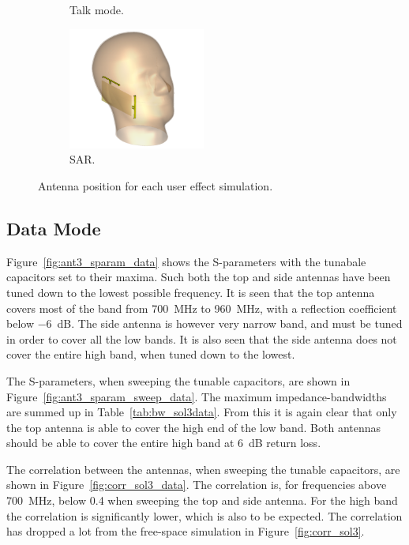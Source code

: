 \begin{figure}[htbp]
\begin{subfigure}[b]{0.24\linewidth}
        \caption{Talk mode.}
    \end{subfigure}
    \begin{subfigure}[b]{0.24\linewidth}
        \centering
        \includegraphics[width=\linewidth,height=4cm,keepaspectratio]{img/tech_sol/nonresonant/simulation/sar/3d}
        \caption{SAR.}
    \end{subfigure}
    \caption{Antenna position for each user effect simulation.}
    \label{fig:ant3_positions}
\end{figure}

\FloatBarrier
\subsection{Data Mode}
Figure~\ref{fig:ant3_sparam_data} shows the S-parameters with the tunabale capacitors set to their maxima. Such both the top and side antennas have been tuned down to the lowest possible frequency. It is seen that the top antenna covers most of the band from \SI{700}{MHz} to \SI{960}{MHz}, with a reflection coefficient below \SI{-6}{dB}. The side antenna is however very narrow band, and must be tuned in order to cover all the low bands. It is also seen that the side antenna does not cover the entire high band, when tuned down to the lowest. 

The S-parameters, when sweeping the tunable capacitors, are shown in Figure~\ref{fig:ant3_sparam_sweep_data}. The maximum impedance-bandwidths are summed up in Table~\ref{tab:bw_sol3data}. From this it is again clear that only the top antenna is able to cover the high end of the low band. Both antennas should be able to cover the entire high band at \SI{6}{dB} return loss.

The correlation between the antennas, when sweeping the tunable capacitors, are shown in Figure~\ref{fig:corr_sol3_data}. The correlation is, for frequencies above \SI{700}{MHz}, below 0.4 when sweeping the top and side antenna. For the high band the correlation is significantly lower, which is also to be expected. The correlation has dropped a lot from the free-space simulation in Figure~\ref{fig:corr_sol3}.

